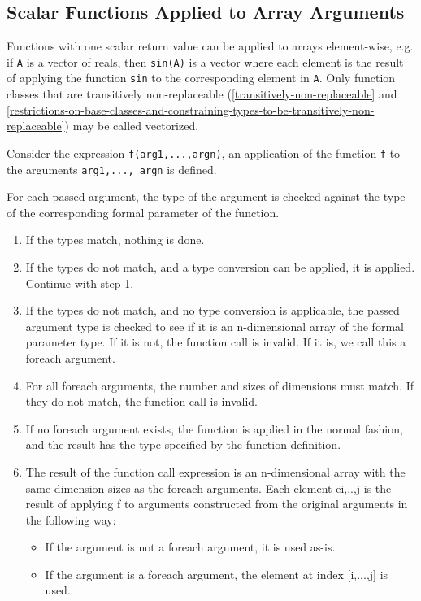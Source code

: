 \subsection{Scalar Functions Applied to Array Arguments}

Functions with one scalar return value can be applied to arrays
element-wise, e.g. if \lstinline!A! is a vector of reals, then \lstinline!sin(A)! is a vector
where each element is the result of applying the function \lstinline!sin! to the
corresponding element in \lstinline!A!. Only function classes that are transitively
non-replaceable (\autoref{transitively-non-replaceable} and \autoref{restrictions-on-base-classes-and-constraining-types-to-be-transitively-non-replaceable}) may be called vectorized.

Consider the expression \lstinline!f(arg1,...,argn)!, an application of the function
\lstinline!f! to the arguments \lstinline!arg1,..., argn! is defined.

For each passed argument, the type of the argument is checked against
the type of the corresponding formal parameter of the function.

\begin{enumerate}
\item
  If the types match, nothing is done.
\item
  If the types do not match, and a type conversion can be applied, it is
  applied. Continue with step 1.
\item
  If the types do not match, and no type conversion is applicable, the
  passed argument type is checked to see if it is an n-dimensional array
  of the formal parameter type. If it is not, the function call is
  invalid. If it is, we call this a foreach argument.
\item
  For all foreach arguments, the number and sizes of dimensions must
  match. If they do not match, the function call is invalid.
\item
  If no foreach argument exists, the function is applied in the normal
  fashion, and the result has the type specified by the function
  definition.
\item
  The result of the function call expression is an n-dimensional array
  with the same dimension sizes as the foreach arguments. Each element
  ei,..,j is the result of applying f to arguments constructed from the
  original arguments in the following way:
\begin{itemize}
\item
  If the argument is not a foreach argument, it is used as-is.
\item
  If the argument is a foreach argument, the element at index
  {[}i,...,j{]} is used.
\end{itemize}
\end{enumerate}

